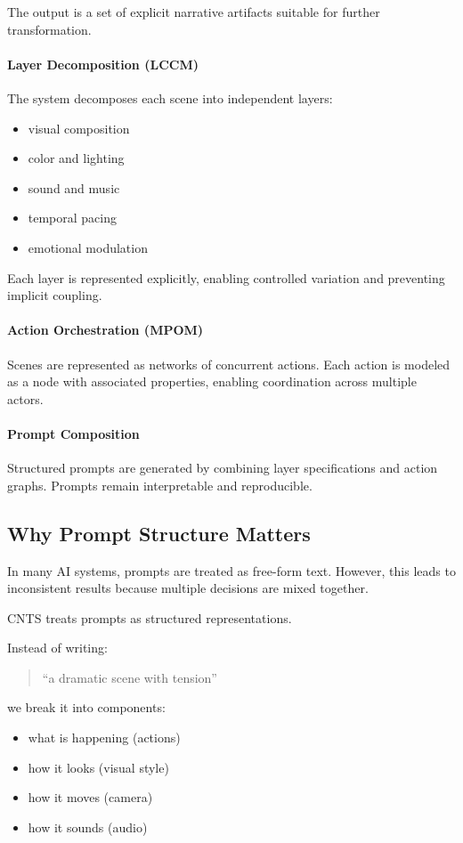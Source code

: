 \documentclass[preprints,article,submit,pdftex,moreauthors,accept]{Definitions/mdpi}
\begin{document}
The output is a set of explicit narrative artifacts suitable for further transformation.

\paragraph{Layer Decomposition (LCCM)}
The system decomposes each scene into independent layers:
\begin{itemize}
    \item visual composition
    \item color and lighting
    \item sound and music
    \item temporal pacing
    \item emotional modulation
\end{itemize}

Each layer is represented explicitly, enabling controlled variation and preventing implicit coupling.

\paragraph{Action Orchestration (MPOM)}
Scenes are represented as networks of concurrent actions. Each action is modeled as a node with associated properties, enabling coordination across multiple actors.

\paragraph{Prompt Composition}
Structured prompts are generated by combining layer specifications and action graphs. Prompts remain interpretable and reproducible.
\subsection{Why Prompt Structure Matters}

In many AI systems, prompts are treated as free-form text. However, this leads to inconsistent results because multiple decisions are mixed together.

CNTS treats prompts as structured representations.

Instead of writing:
\begin{quote}
``a dramatic scene with tension''
\end{quote}

we break it into components:

\begin{itemize}
    \item what is happening (actions)
    \item how it looks (visual style)
    \item how it moves (camera)
    \item how it sounds (audio)
\end{itemize}
\end{document}
